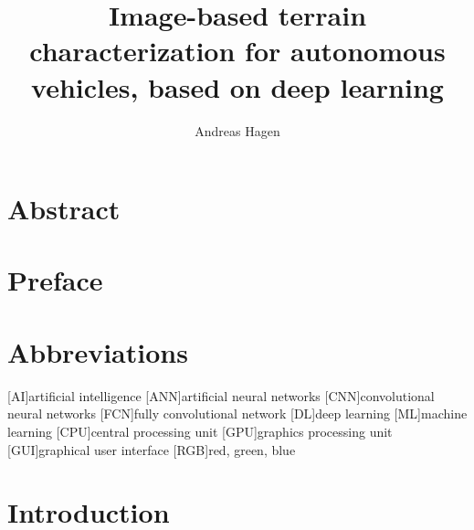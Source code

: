 \documentclass[USenglish]{ifimaster}  %
\title{Image-based terrain characterization for autonomous vehicles, based on deep learning}        %
\author{Andreas Hagen}                      %
\begin{document}
\duoforside[dept={Department of Technology Systems},   %
  program={Cybernetics},  %
  short]                                        %

\frontmatter{}
\chapter*{Abstract}                   %

\tableofcontents{}
\listoffigures{}
\listoftables{}

\chapter*{Preface}
\chapter*{Abbreviations}
\begin{acronym}
        [AI]{artificial intelligence}
        [ANN]{artificial neural networks}
        [CNN]{convolutional neural networks}
        [FCN]{fully convolutional network}
        [DL]{deep learning}
        [ML]{machine learning}
        [CPU]{central processing unit}
        [GPU]{graphics processing unit}
        [GUI]{graphical user interface}
        [RGB]{red, green, blue}
\end{acronym}


\mainmatter{}
\chapter{Introduction}                  
\end{document}
